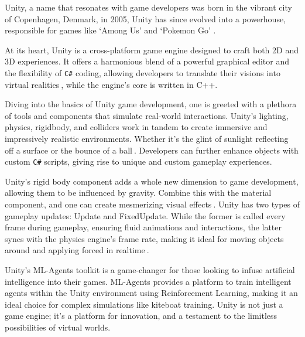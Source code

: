 Unity, a name that resonates with game developers was born in the vibrant city of Copenhagen, Denmark, in 2005, Unity has since evolved into a powerhouse, responsible for games like `Among Us' and `Pokemon Go' \cite{unity100seconds}.

At its heart, Unity is a cross-platform game engine designed to craft both 2D and 3D experiences. It offers a harmonious blend of a powerful graphical editor and the flexibility of \texttt{C\#} coding, allowing developers to translate their visions into virtual realities$~$\cite{unitymanual2021}, while the engine's core is written in C++.

Diving into the basics of Unity game development, one is greeted with a plethora of tools and components that simulate real-world interactions. Unity's lighting, physics, rigidbody, and colliders work in tandem to create immersive and impressively realistic environments. Whether it's the glint of sunlight reflecting off a surface or the bounce of a ball$~$\cite{goldstone2010}. Developers can further enhance objects with custom \texttt{C\#} scripts, giving rise to unique and custom gameplay experiences.


Unity's rigid body component adds a whole new dimension to game development, allowing them to be influenced by gravity. Combine this with the material component, and one can create mesmerizing visual effects$~$\cite{blackman2012}. Unity has two types of gameplay updates: Update and FixedUpdate. While the former is called every frame during gameplay, ensuring fluid animations and interactions, the latter syncs with the physics engine's frame rate, making it ideal for moving objects around and applying forced in realtime$~$\cite{unityupdatefixedupdate}.

Unity's ML-Agents toolkit is a game-changer for those looking to infuse artificial intelligence into their games. ML-Agents provides a platform to train intelligent agents within the Unity environment using Reinforcement Learning, making it an ideal choice for complex simulations like kiteboat training. Unity is not just a game engine; it's a platform for innovation, and a testament to the limitless possibilities of virtual worlds.

